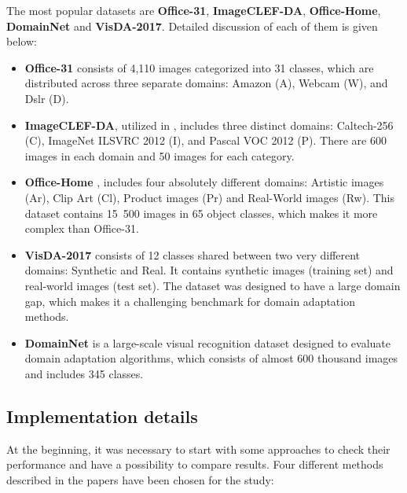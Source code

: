 The most popular datasets are \textbf{Office-31}, \textbf{ImageCLEF-DA}, \textbf{Office-Home}, \textbf{DomainNet} and \textbf{VisDA-2017}. Detailed discussion of each of them is given below:

\begin{itemize}
    \item \textbf{Office-31} \cite{saenko2010adapting} consists of 4,110 images categorized into 31 classes, which are distributed across three separate domains: Amazon (A), Webcam (W), and Dslr (D).
    \item \textbf{ImageCLEF-DA}, utilized in \cite{long2017deep}, includes three distinct domains: Caltech-256 (C), ImageNet ILSVRC 2012 (I), and Pascal VOC 2012 (P). There are 600 images in each domain and 50 images for each category.
    \item \textbf{Office-Home} \cite{venkateswara2017deep}, includes four absolutely different domains: Artistic images (Ar), Clip Art (Cl), Product images (Pr) and Real-World images (Rw). This dataset contains 15~500 images in 65 object classes, which makes it more complex than Office-31.
    \item \textbf{VisDA-2017} \cite{peng2017visda} consists of 12 classes shared between two very different domains: Synthetic and Real. It contains synthetic images (training set) and real-world images (test set). The dataset was designed to have a large domain gap, which makes it a challenging benchmark for domain adaptation methods.
    \item \textbf{DomainNet} \cite{peng2019moment} is a large-scale visual recognition dataset designed to evaluate domain adaptation algorithms, which consists of almost 600 thousand images and includes 345 classes.
\end{itemize}

\newpage

\subsection{Implementation details}

At the beginning, it was necessary to start with some approaches to check their performance and have a possibility to compare results. Four different methods described in the papers have been chosen for the study:

